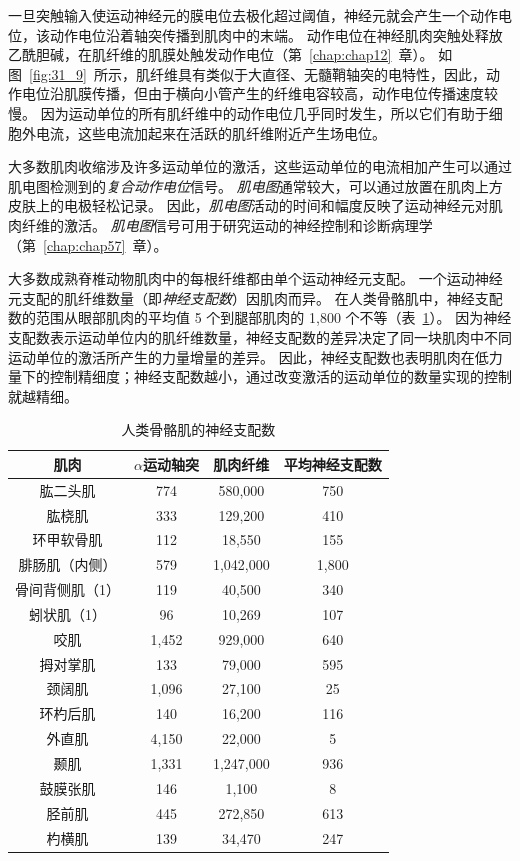 一旦突触输入使运动神经元的膜电位去极化超过阈值，神经元就会产生一个动作电位，该动作电位沿着轴突传播到肌肉中的末端。
动作电位在神经肌肉突触处释放乙酰胆碱，在肌纤维的肌膜处触发动作电位（第~\ref{chap:chap12}~章）。
如图~\ref{fig:31_9}~所示，肌纤维具有类似于大直径、无髓鞘轴突的电特性，因此，动作电位沿肌膜传播，但由于横向小管产生的纤维电容较高，动作电位传播速度较慢。
因为运动单位的所有肌纤维中的动作电位几乎同时发生，所以它们有助于细胞外电流，这些电流加起来在活跃的肌纤维附近产生场电位。


大多数肌肉收缩涉及许多运动单位的激活，这些运动单位的电流相加产生可以通过肌电图检测到的\textit{复合动作电位}信号。
\textit{肌电图}通常较大，可以通过放置在肌肉上方皮肤上的电极轻松记录。
因此，\textit{肌电图}活动的时间和幅度反映了运动神经元对肌肉纤维的激活。
\textit{肌电图}信号可用于研究运动的神经控制和诊断病理学（第~\ref{chap:chap57}~章）。


大多数成熟脊椎动物肌肉中的每根纤维都由单个运动神经元支配。
一个运动神经元支配的肌纤维数量（即\textit{神经支配数}）因肌肉而异。
在人类骨骼肌中，神经支配数的范围从眼部肌肉的平均值 5 个到腿部肌肉的 1,800 个不等（表~\ref{tab:31_1}）。
因为神经支配数表示运动单位内的肌纤维数量，神经支配数的差异决定了同一块肌肉中不同运动单位的激活所产生的力量增量的差异。
因此，神经支配数也表明肌肉在低力量下的控制精细度；神经支配数越小，通过改变激活的运动单位的数量实现的控制就越精细。


\begin{table}[htbp]
	\caption{人类骨骼肌的神经支配数\label{tab:31_1}}
	\centering
	\begin{tabular}{cccc}
		\toprule
		肌肉 & $ \alpha $运动轴突 & 肌肉纤维 & 平均神经支配数\\
		\midrule
		肱二头肌 & 774  & 580,000 & 750 \\
		肱桡肌 & 333  & 129,200 & 410 \\
		环甲软骨肌 & 112  & 18,550 & 155 \\
		腓肠肌（内侧） & 579  & 1,042,000 & 1,800 \\
		骨间背侧肌（1） & 119  & 40,500 & 340 \\
		蚓状肌（1） & 96  & 10,269 & 107 \\
		咬肌 & 1,452  & 929,000 & 640 \\
		拇对掌肌 & 133  & 79,000 & 595 \\
		颈阔肌 & 1,096  & 27,100 & 25 \\
		环杓后肌 & 140  & 16,200 & 116 \\
		外直肌 & 4,150  & 22,000 & 5 \\
		颞肌 & 1,331  & 1,247,000 & 936 \\
		鼓膜张肌 & 146  & 1,100 & 8 \\
		胫前肌 & 445  & 272,850 & 613 \\
		杓横肌 & 139  & 34,470 & 247 \\
		\bottomrule
	\end{tabular}
\end{table}


